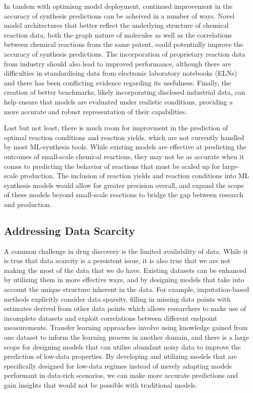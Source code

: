 In tandem with optimisng model deployment, continued improvement in the accuracy of synthesis predictions can be acheived in a number of ways. Novel model architectures that better reflect the underlying structure of chemical reaction data, both the graph nature of molecules as well as the correlations between chemical reactions from the same patent, could potentially improve the accuracy of synthesis predictions. The incorporation of proprietary reaction data from industry should also lead to improved performance, although there are difficulties in standardising data from electronic laboratory notebooks (ELNs) and there has been conflicting evidence regarding its usefulness. Finally, the creation of better benchmarks, likely incorporating disclosed industrial data, can help ensure that models are evaluated under realistic conditions, providing a more accurate and robust representation of their capabilities.

Last but not least, there is much room for improvment in the prediction of optimal reaction conditions and reaction yields, which are not currently handled by most ML-synthesis tools.  While existing models are effective at predicting the outcomes of small-scale chemical reactions, they may not be as accurate when it comes to predicting the behavior of reactions that must be scaled up for large-scale production. The inclusion of reaction yields and reaction conditions into ML synthesis models would allow for greater precision overall, and expand the scope of these models beyond small-scale reactions to bridge the gap between research and production.

\subsection{Addressing Data Scarcity}
A common challenge in drug discovery is the limited availability of data. While it is true that data scarcity is a persistent issue, it is also true that we are not making the most of the data that we do have. Existing datasets can be enhanced by utilizing them in more effective ways, and by designing models that take into account the unique structure inherent in the data. For example, imputation-based methods explicitly consider data sparsity, filling in missing data points with estimates derived from other data points which allows researchers to make use of incomplete datasets and exploit correlations between different endpoint measurements. Transfer learning approaches involve using knowledge gained from one dataset to inform the learning process in another domain, and there is a large scope for designing models that can utilise abundant noisy data to improve the prediction of low-data properties. By developing and utilizing models that are specifically designed for low-data regimes instead of merely adapting models performant in data-rich scenarios, we can make more accurate predictions and gain insights that would not be possible with traditional models.

